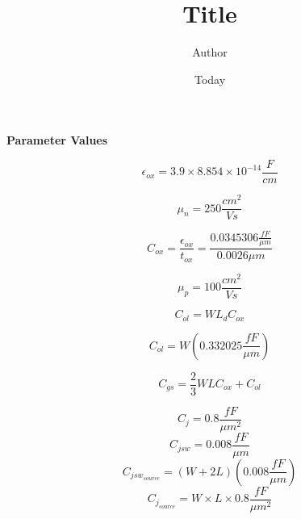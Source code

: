 \documentclass[]{article}
\begin{document}
\title{Title}
\author{Author}
\date{Today}
\maketitle

		
	\pagebreak

	{\bf Parameter Values }
	\newline
	
	$$ \epsilon_{ox} = 3.9 \times 8.854 \times 10^{-14} \frac{F}{cm} $$

	$$ \mu_{n} = 250 \frac{cm^2}{Vs}$$

	$$ C_{ox} = \frac{\epsilon_{ox}}{t_{ox}} = \frac{0.0345306 \frac{fF}{\mu m}}{0.0026 \mu m} $$

	\begin{center} \end{center}

	\begin{center}  \end{center}

	$$ \mu_{p} = 100 \frac{cm^2}{Vs} $$

	\begin{center} \end{center}

	$$C_{ol} = WL_{d}C_{ox}$$

	$$ C_{ol} = W(0.332025 \frac{fF}{\mu m}) $$

	$$ C_{gs} = \frac{2}{3}WLC_{ox} + C_{ol}$$

	\begin{center} \end{center}

	\begin{center} \end{center}

	$$C_{j} = 0.8 \frac{fF}{\mu m^2} $$
	$$C_{jsw} = 0.008 \frac{fF}{\mu m} $$
	$$ C_{jsw_{source}} = (W+2L)(0.008 \frac{fF}{\mu m}) $$
	$$ C_{j_{source}} = W \times L \times 0.8 \frac{fF}{\mu m^2}$$

	\begin{center}  \end{center}
	\begin{center}  \end{center}
\end{document}
